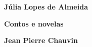 \textbf{Júlia Lopes de Almeida} \lipsum[1]

\textbf{Contos e novelas} \lipsum[2]

\textbf{Jean Pierre Chauvin} \lipsum[3]







